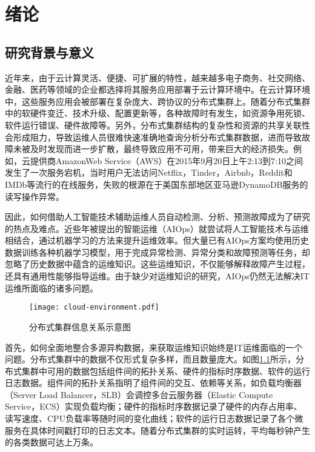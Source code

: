 \chapter{绪论}
\section{研究背景与意义}
近年来，由于云计算灵活、便捷、可扩展的特性，越来越多电子商务、社交网络、金融、医药等领域的企业都选择将其服务应用部署于云计算环境中。在云计算环境中，这些服务应用会被部署在复杂庞大、跨协议的分布式集群上。随着分布式集群中的软硬件变迁、技术升级、配置更新等，各种故障时有发生，如资源争用死锁、软件运行错误、硬件故障等。另外，分布式集群结构的复杂性和资源的共享关联性会形成阻力，导致运维人员很难快速准确地查询分析分布式集群数据，进而导致故障未被及时发现而进一步扩散，最终导致应用不可用，带来巨大的经济损失。例如，云提供商AmazonWeb Service（AWS）在2015年9月20日上午2:13到7:10之间发生了一次服务宕机，当时用户无法访问Netflix，Tinder，Airbnb，Reddit和IMDb等流行的在线服务，失败的根源在于美国东部地区亚马逊DynamoDB服务的读写操作异常。

因此，如何借助人工智能技术辅助运维人员自动检测、分析、预测故障成为了研究的热点及难点。近些年被提出的智能运维（AIOps）就尝试将人工智能技术与运维相结合，通过机器学习的方法来提升运维效率。但大量已有AIOps方案均使用历史数据训练各种机器学习模型，用于完成异常检测、异常分类和故障预测等任务，却忽略了历史数据中蕴含的运维知识。这些运维知识，不仅能够解释故障产生过程，还具有通用性能够指导运维。由于缺少对运维知识的研究，AIOps仍然无法解决IT运维所面临的诸多问题。

\begin{figure}[htbp]
    \centering
    \texttt{[image: cloud-environment.pdf]}
    \caption{分布式集群信息关系示意图\label{cloud-environment}}
\end{figure}

首先，如何全面地整合多源异构数据，来获取运维知识始终是IT运维面临的一个问题。分布式集群中的数据不仅形式复杂多样，而且数量庞大。如图\ref{cloud-environment}所示，分布式集群中可用的数据包括组件间的拓扑关系、硬件的指标时序数据、软件的运行日志数据。组件间的拓扑关系指明了组件间的交互、依赖等关系，如负载均衡器（Server Load Balancer，SLB）会调控多台云服务器（Elastic Compute Service，ECS）实现负载均衡；硬件的指标时序数据记录了硬件的内存占用率、读写速度、CPU负载率等随时间的变化曲线；软件的运行日志数据记录了各个微服务在具体时间戳打印的日志文本。随着分布式集群的实时运转，平均每秒钟产生的各类数据可达上万条。

